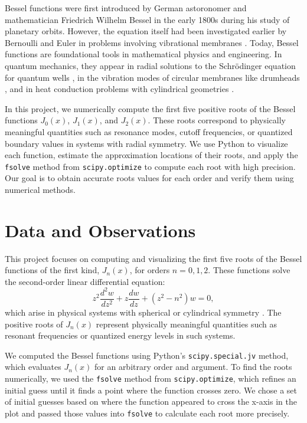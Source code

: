 \documentclass[linenumbers, twocolumn]{aastex631}
\begin{document}
\noindent Bessel functions were first introduced by German astoronomer and
mathematician Friedrich Wilhelm Bessel in the early 1800s during his study of
planetary orbits. However, the equation itself had been investigated earlier
by Bernoulli and Euler in problems involving vibrational membranes
\citet{abramowitz_stegun}. Today, Bessel functions are foundational tools in 
mathematical physics and engineering. In quantum mechanics, they appear in 
radial solutions to the Schrödinger equation for quantum wells \cite{hanson}, in the 
vibration modes of circular membranes like drumheads \cite{tamrin}, and in heat 
conduction problems with cylindrical geometries \cite{tsega}.

\noindent In this project, we numerically compute the first five positive roots
of the Bessel functions $J_0(x)$, $J_1(x)$, and $J_2(x)$. These roots correspond
to physically meaningful quantities such as resonance modes, cutoff frequencies, 
or quantized boundary values in systems with radial symmetry. We use Python to visualize each
function, estimate the approximation locations of their roots, and apply the \texttt{fsolve}
method from \texttt{scipy.optimize} to compute each root with high precision. 
Our goal is to obtain accurate roots values for each order and verify them 
using numerical methods.\\


\section{Data and Observations} \label{sec:data}

This project focuses on computing and visualizing the first five roots of the
Bessel functions of the first kind, $J_n(x)$, for orders $n=0,1,2$. These
functions solve the second-order linear differential equation:
\begin{equation}
    z^2\frac{d^2 w}{dz^2}+z\frac{dw}{dz}+(z^2-n^2)w=0,
\end{equation}
\noindent which arise in physical systems with spherical or cylindrical 
symmetry \citet{abramowitz_stegun}. The positive roots of $J_n(x)$ represent physically meaningful
quantities such as resonant frequencies or quantized energy levels in such
systems.

\noindent We computed the Bessel functions using Python's \texttt{scipy.special.jv}
method, which evaluates $J_n(x)$ for an arbitrary order and argument. To
find the roots numerically, we used the \texttt{fsolve} method from \texttt{scipy.optimize},
which refines an initial guess until it finds a point where the function crosses
zero. We chose a set of initial guesses based on where the function appeared to
cross the x-axis in the plot and passed those values into \texttt{fsolve} to
calculate each root more precisely. 
\end{document}
